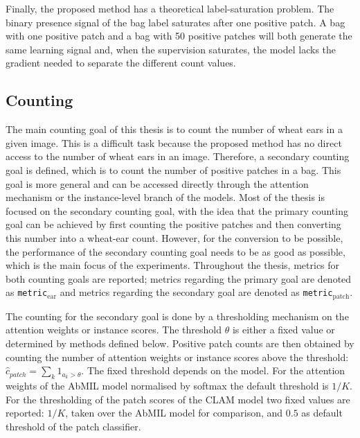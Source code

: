\documentclass[12pt,parskip = half, DIV=classic,listof=totoc]{scrartcl}
\begin{document}
			Finally, the proposed method has a theoretical label-saturation problem. The binary presence signal of the bag label saturates after 
			one positive patch. A bag with one positive patch and a bag with 50 positive patches will both generate the same learning signal and, when 
			the supervision saturates, the model lacks the gradient needed to separate the different count values.
		
		\subsection{Counting}\label{sec:counting}
			The main counting goal of this thesis is to count the number of wheat ears in a given image. This is a difficult task because the 
			proposed method has no direct access to the number of wheat ears in an image. Therefore, a secondary counting goal is defined,
			which is to count the number of positive patches in a bag. This goal is more general and can be accessed directly through the 
			attention mechanism or the instance-level branch of the models. Most of the thesis is focused on the secondary counting goal,
			with the idea that the primary counting goal can be achieved by first counting the positive patches and then converting this 
			number into a wheat-ear count. However, for the conversion to be possible, the performance of the secondary counting goal
			needs to be as good as possible, which is the main focus of the experiments. Throughout the thesis, metrics for both counting goals are reported;
			metrics regarding the primary goal are denoted as \texttt{metric}$_{\text{ear}}$ and metrics regarding the secondary goal are denoted as \texttt{metric}$_{\text{patch}}$.

			The counting for the secondary goal is done by a thresholding mechanism on the attention weights or instance scores.
			The threshold $\theta$ is either a fixed value or determined by methods defined below. Positive patch counts are then obtained 
			by counting the number of attention weights or instance scores above the threshold: $\hat{c}_{patch} = \sum_k 1_{a_k>\theta}$.
			The fixed threshold depends on the model. For the attention weights of the AbMIL model normalised by softmax the default
			threshold is $1/K$. For the thresholding of the patch scores of the CLAM model two fixed values are reported:
			$1/K$, taken over the AbMIL model for comparison, and $0.5$ as default threshold of the patch classifier.
\end{document}
